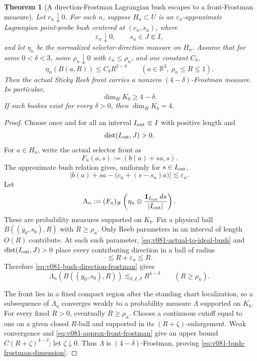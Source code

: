 \documentclass[10pt]{article}
\newtheorem{theorem}{Theorem}[section]
\newcommand{\dist}{\operatorname{dist}}
\begin{document}
\begin{theorem}[A direction-Frostman Lagrangian bush escapes to a front-Frostman measure]
\label{thm:v081-bush-frostman-escape}
Let \(r_n\downarrow0\).  For each \(n\), suppose \(H_n\subset U\) is an
\(\varepsilon_n\)-approximate Lagrangian point-probe bush centered at
\((c_n,s_n)\), where
\[
\varepsilon_n\downarrow0,
\qquad
s_n\in J\Subset I,
\]
and let \(\eta_n\) be the normalized selector-direction measure on \(H_n\).  Assume that for some
\(0<\delta<3\), some \(\rho_n\downarrow0\) with
\(\varepsilon_n\le\rho_n\), and one constant \(C_\delta\),
\begin{equation}
\label{eq:v081-bush-direction-frostman}
\boxed{
\eta_n(B(a,R))
\le
C_\delta R^{3-\delta}
\qquad
(a\in\mathbb R^3,\ \rho_n\le R\le1).
}
\end{equation}
Then the actual Sticky Reeb front carries a nonzero
\((4-\delta)\)-Frostman measure.  In particular,
\begin{equation}
\label{eq:v081-bush-frostman-dimension}
\boxed{
\dim_HK_b\ge4-\delta.
}
\end{equation}
If such bushes exist for every \(\delta>0\), then
\(\dim_HK_b=4\).
\end{theorem}

\begin{proof}
Choose once and for all an interval \(I_{\rm out}\Subset I\) with positive length and
\[
\dist(I_{\rm out},J)>0.
\]
For \(a\in H_n\), write the actual selector front as
\[
F_n(a,s):=(b(a)+sa,s).
\]
The approximate bush relation gives, uniformly for \(s\in I_{\rm out}\),
\begin{equation}
\label{eq:v081-actual-to-ideal-bush}
\left|
b(a)+sa-\bigl(c_n+(s-s_n)a\bigr)
\right|
\lesssim
\varepsilon_n.
\end{equation}
Let
\[
\Lambda_n
:=
(F_n)_\#
\left(
\eta_n\otimes\frac{\mathbf1_{I_{\rm out}}\,ds}{|I_{\rm out}|}
\right).
\]
These are probability measures supported on \(K_b\).  Fix a physical ball
\(B((y_0,s_0),R)\) with \(R\ge\rho_n\).  Only Reeb parameters in an interval of length
\(O(R)\) contribute.  At each such parameter,
\eqref{eq:v081-actual-to-ideal-bush} and
\(\dist(I_{\rm out},J)>0\) place every contributing direction in a ball of radius
\[
\lesssim R+\varepsilon_n
\lesssim R.
\]
Therefore \eqref{eq:v081-bush-direction-frostman} gives
\begin{equation}
\label{eq:v081-approx-front-frostman}
\boxed{
\Lambda_n(B((y_0,s_0),R))
\lesssim_{\delta,I,J}
R^{4-\delta}
\qquad
(R\ge\rho_n).
}
\end{equation}

The front lies in a fixed compact region after the standing chart localization, so a subsequence
of \(\Lambda_n\) converges weakly to a probability measure \(\Lambda\) supported on \(K_b\).
For every fixed \(R>0\), eventually \(R\ge\rho_n\).  Choose a continuous cutoff equal to one on a
given closed \(R\)-ball and supported in its \((R+\zeta)\)-enlargement.  Weak convergence and
\eqref{eq:v081-approx-front-frostman} give an upper bound
\(C(R+\zeta)^{4-\delta}\); let \(\zeta\downarrow0\).  Thus \(\Lambda\) is
\((4-\delta)\)-Frostman, proving \eqref{eq:v081-bush-frostman-dimension}.
\end{proof}
\end{document}
